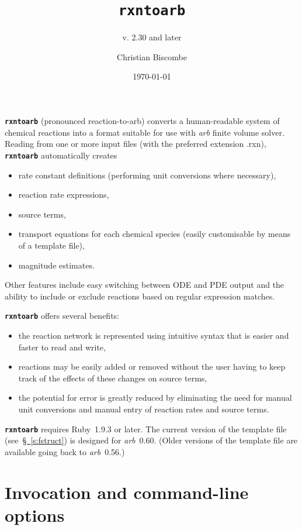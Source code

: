 \documentclass[fontsize=12pt,
               captions=abovetable,
               numbers=noenddot,
              ]{scrartcl}
\newcommand{\sect}[1]{\hyperref[s:#1]{\S~\ref{s:#1}}}
\newcommand{\rxntoarb}{\texttt{\textbf{rxntoarb}}}
\begin{document}
\title{\rxntoarb}
\subtitle{v. 2.30 and later}
\author{Christian Biscombe}
\date{\large\today}
\maketitle

\rxntoarb{} (pronounced reaction-to-arb) converts a human-readable system of chemical reactions into a format suitable for use with \emph{arb} finite volume solver. Reading from one or more input files (with the preferred extension .rxn), \rxntoarb{} automatically creates
\begin{itemize}
\item rate constant definitions (performing unit conversions where necessary),
\item reaction rate expressions,
\item source terms,
\item transport equations for each chemical species (easily customisable by means of a template file),
\item magnitude estimates.
\end{itemize}
Other features include easy switching between ODE and PDE output and the ability to include or exclude reactions based on regular expression matches.

\rxntoarb{} offers several benefits:
\begin{itemize}
\item the reaction network is represented using intuitive syntax that is easier and faster to read and write,
\item reactions may be easily added or removed without the user having to keep track of the effects of these changes on source terms,
\item the potential for error is greatly reduced by eliminating the need for manual unit conversions and manual entry of reaction rates and source terms.
\end{itemize}

\rxntoarb{} requires Ruby~1.9.3 or later. The current version of the template file (see~\sect{fstruct}) is designed for \emph{arb}~0.60. (Older versions of the template file are available going back to \emph{arb}~0.56.)

\clearpage
\tableofcontents
\clearpage

\section{Invocation and command-line options \label{s:invoc}}
\end{document}
